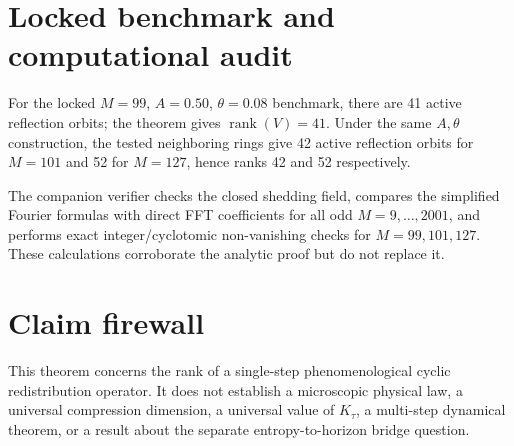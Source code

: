 \documentclass[11pt]{article}
\begin{document}
\section{Locked benchmark and computational audit}
For the locked $M=99$, $A=0.50$, $\theta=0.08$ benchmark, there are 41 active reflection orbits; the theorem gives $\operatorname{rank}(V)=41$. Under the same $A,\theta$ construction, the tested neighboring rings give 42 active reflection orbits for $M=101$ and 52 for $M=127$, hence ranks 42 and 52 respectively.

The companion verifier checks the closed shedding field, compares the simplified Fourier formulas with direct FFT coefficients for all odd $M=9,\dots,2001$, and performs exact integer/cyclotomic non-vanishing checks for $M=99,101,127$. These calculations corroborate the analytic proof but do not replace it.

\section{Claim firewall}
This theorem concerns the rank of a single-step phenomenological cyclic redistribution operator. It does not establish a microscopic physical law, a universal compression dimension, a universal value of $K_\tau$, a multi-step dynamical theorem, or a result about the separate entropy-to-horizon bridge question.
\end{document}
